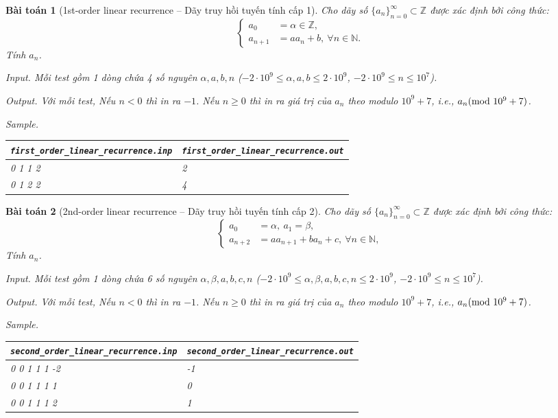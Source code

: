 \documentclass{article}
\newtheorem{baitoan}{Bài toán}
\begin{document}
\begin{baitoan}[1st-order linear recurrence -- Dãy truy hồi tuyến tính cấp 1]
	Cho dãy số $\{a_n\}_{n=0}^\infty\subset\mathbb{Z}$ được xác định bởi công thức:
	\begin{equation*}
		\left\{\begin{split}
			a_0 &= \alpha\in\mathbb{Z},\\
			a_{n+1} &= aa_{n} + b,\ \forall n\in\mathbb{N}.
		\end{split}\right.
	\end{equation*}
	Tính $a_n$.
	\item {\sf Input.} Mỗi test gồm 1 dòng chứa 4 số nguyên $\alpha,a,b,n$ ($-2\cdot10^9\le\alpha,a,b\le2\cdot10^9$, $-2\cdot10^9\le n\le10^7$).
	\item {\sf Output.} Với mỗi test, Nếu $n < 0$ thì in ra $-1$. Nếu $n\ge0$ thì in ra giá trị của $a_n$ theo modulo $10^9 + 7$, i.e., $a_n({\rm mod}\ 10^9 + 7)$.
	\item {\sf Sample.}
	\begin{table}[H]
		\centering
		\begin{tabular}{|l|l|}
			\hline
			\verb|first_order_linear_recurrence.inp| & \verb|first_order_linear_recurrence.out| \\
			\hline
			0 1 1 2 & 2\\
			\hline
			0 1 2 2 & 4\\
			\hline
		\end{tabular}
	\end{table}
\end{baitoan}

\begin{baitoan}[2nd-order linear recurrence -- Dãy truy hồi tuyến tính cấp 2]
	Cho dãy số $\{a_n\}_{n=0}^\infty\subset\mathbb{Z}$ được xác định bởi công thức:
	\begin{equation*}
		\left\{\begin{split}
			a_0 &= \alpha,\ a_1 = \beta,\\
			a_{n+2} &= aa_{n+1} + ba_n + c,\ \forall n\in\mathbb{N},
		\end{split}\right.
	\end{equation*}
	Tính $a_n$.
	\item {\sf Input.} Mỗi test gồm 1 dòng chứa 6 số nguyên $\alpha,\beta,a,b,c,n$ ($-2\cdot10^9\le\alpha,\beta,a,b,c,n\le2\cdot10^9$, $-2\cdot10^9\le n\le10^7$).
	\item {\sf Output.} Với mỗi test, Nếu $n < 0$ thì in ra $-1$. Nếu $n\ge0$ thì in ra giá trị của $a_n$ theo modulo $10^9 + 7$, i.e., $a_n({\rm mod}\ 10^9 + 7)$.
	\item {\sf Sample.}
	\begin{table}[H]
		\centering
		\begin{tabular}{|l|l|}
			\hline
			\verb|second_order_linear_recurrence.inp| & \verb|second_order_linear_recurrence.out| \\
			\hline
			0 0 1 1 1 -2 & -1\\
			\hline
			0 0 1 1 1 1 & 0\\
			\hline
			0 0 1 1 1 2 & 1\\
			\hline
		\end{tabular}
	\end{table}
\end{baitoan}


\printbibliography[heading=bibintoc]
\end{document}
